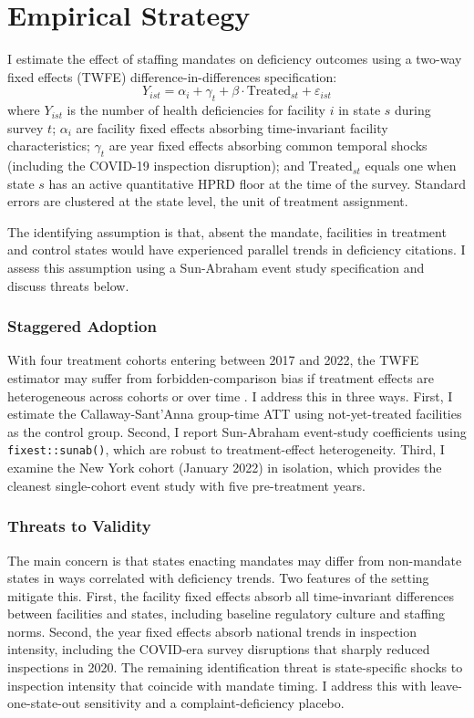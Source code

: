 \documentclass[12pt]{article}
\begin{document}
\section{Empirical Strategy}

I estimate the effect of staffing mandates on deficiency outcomes using a two-way fixed effects (TWFE) difference-in-differences specification:
\begin{equation}
Y_{ist} = \alpha_i + \gamma_t + \beta \cdot \text{Treated}_{st} + \varepsilon_{ist}
\label{eq:twfe}
\end{equation}
where $Y_{ist}$ is the number of health deficiencies for facility $i$ in state $s$ during survey $t$; $\alpha_i$ are facility fixed effects absorbing time-invariant facility characteristics; $\gamma_t$ are year fixed effects absorbing common temporal shocks (including the COVID-19 inspection disruption); and $\text{Treated}_{st}$ equals one when state $s$ has an active quantitative HPRD floor at the time of the survey. Standard errors are clustered at the state level, the unit of treatment assignment.

The identifying assumption is that, absent the mandate, facilities in treatment and control states would have experienced parallel trends in deficiency citations. I assess this assumption using a Sun-Abraham event study specification and discuss threats below.

\subsubsection*{Staggered Adoption} With four treatment cohorts entering between 2017 and 2022, the TWFE estimator may suffer from forbidden-comparison bias if treatment effects are heterogeneous across cohorts or over time \citep{goodman-bacon2021, callaway2021}. I address this in three ways. First, I estimate the Callaway-Sant'Anna group-time ATT using not-yet-treated facilities as the control group. Second, I report Sun-Abraham event-study coefficients using \texttt{fixest::sunab()}, which are robust to treatment-effect heterogeneity. Third, I examine the New York cohort (January 2022) in isolation, which provides the cleanest single-cohort event study with five pre-treatment years.

\subsubsection*{Threats to Validity} The main concern is that states enacting mandates may differ from non-mandate states in ways correlated with deficiency trends. Two features of the setting mitigate this. First, the facility fixed effects absorb all time-invariant differences between facilities and states, including baseline regulatory culture and staffing norms. Second, the year fixed effects absorb national trends in inspection intensity, including the COVID-era survey disruptions that sharply reduced inspections in 2020. The remaining identification threat is state-specific shocks to inspection intensity that coincide with mandate timing. I address this with leave-one-state-out sensitivity and a complaint-deficiency placebo.
\end{document}
